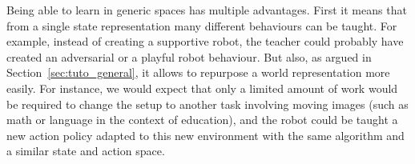 Being able to learn in generic spaces has multiple advantages. First it means that from a single state representation many different behaviours can be taught. For example, instead of creating a supportive robot, the teacher could probably have created an adversarial or a playful robot behaviour. But also, as argued in Section~\ref{sec:tuto_general}, it allows to repurpose a world representation more easily. For instance, we would expect that only a limited amount of work would be required to change the setup to another task involving moving images (such as math or language in the context of education), and the robot could be taught a new action policy adapted to this new environment with the same algorithm and a similar state and action space. 









